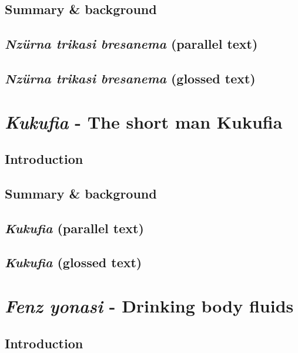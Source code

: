 \documentclass[output=book,
		  ]{langscibook}
\begin{document}
\section{Summary \& background}
    
\section{\textit{Nzürna trikasi bresanema} (parallel text)}
    
    \newpage
\section{\textit{Nzürna trikasi bresanema} (glossed text)}
    

\chapter{\textit{Kukufia} - The short man Kukufia}\label{text:kukufia}
    \vspace{-.4cm}
\section{Introduction}
    
    \vspace{-.4cm}
\section{Summary \& background}
    
    \vspace{-.4cm}
\section{\textit{Kukufia} (parallel text)}
    
    \newpage
\section{\textit{Kukufia} (glossed text)}
    

\chapter{\textit{Fenz yonasi} - Drinking body fluids}\label{text:fenz-nakre}
\section{Introduction}
    
\end{document}
